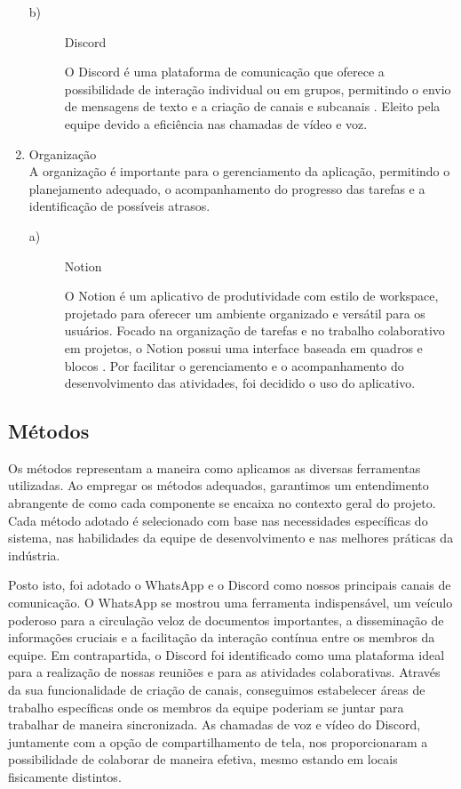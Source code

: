 \documentclass[
    article,			%
    12pt,				%
    oneside,            %
    a4paper,			%
    english,			%
    brazil,				%
    ]{abntex2}
\begin{document}
\begin{enumerate}
\begin{description}
    \item[b)] Discord \par O Discord é uma plataforma de comunicação que oferece a possibilidade de interação individual ou em grupos, permitindo o envio de mensagens de texto e a criação de canais e subcanais \cite{Discord}. Eleito pela equipe devido a eficiência nas chamadas de vídeo e voz. \\
\end{description}

    \item Organização \\
    A organização é importante para o gerenciamento da aplicação, permitindo o planejamento adequado, o acompanhamento do progresso das tarefas e a identificação de possíveis atrasos. \\
    
\begin{description}
    \item[a)] Notion \par O Notion é um aplicativo de produtividade com estilo de workspace, projetado para oferecer um ambiente organizado e versátil para os usuários. Focado na organização de tarefas e no trabalho colaborativo em projetos, o Notion possui uma interface baseada em quadros e blocos \cite{Notion}. Por facilitar o gerenciamento e o acompanhamento do desenvolvimento das atividades, foi decidido o uso do aplicativo.
\end{description}
\end{enumerate}


\subsection{Métodos}
    Os métodos representam a maneira como aplicamos as diversas ferramentas utilizadas. Ao empregar os métodos adequados, garantimos um entendimento abrangente de como cada componente se encaixa no contexto geral do projeto. Cada método adotado é selecionado com base nas necessidades específicas do sistema, nas habilidades da equipe de desenvolvimento e nas melhores práticas da indústria. 
    
    Posto isto, foi adotado o WhatsApp e o Discord como nossos principais canais de comunicação. O WhatsApp se mostrou uma ferramenta indispensável, um veículo poderoso para a circulação veloz de documentos importantes, a disseminação de informações cruciais e a facilitação da interação contínua entre os membros da equipe. Em contrapartida, o Discord foi identificado como uma plataforma ideal para a realização de nossas reuniões e para as atividades colaborativas. Através da sua funcionalidade de criação de canais, conseguimos estabelecer áreas de trabalho específicas onde os membros da equipe poderiam se juntar para trabalhar de maneira sincronizada. As chamadas de voz e vídeo do Discord, juntamente com a opção de compartilhamento de tela, nos proporcionaram a possibilidade de colaborar de maneira efetiva, mesmo estando em locais fisicamente distintos.
    
\end{document}
